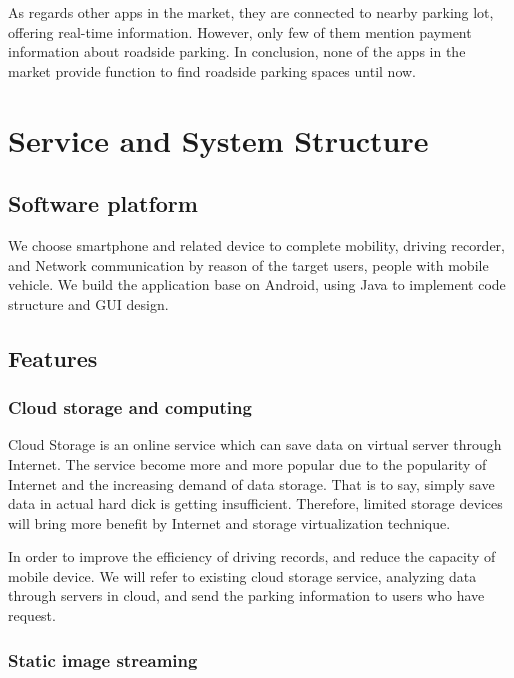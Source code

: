 \documentclass[runningheads,a4paper]{llncs}
\begin{document}
As regards other apps in the market, they are connected to nearby
parking lot, offering real-time information. However, only few of
them mention payment information about roadside parking. In conclusion,
none of the apps in the market provide function to find roadside parking
spaces until now.

\section{Service and System Structure}\label{sec:service}

%
\subsection{Software platform}
%

We choose smartphone and related device to complete mobility, driving
recorder, and Network communication by reason of the target users,
people with mobile vehicle. We build the application base on Android,
using Java to implement code structure and GUI design.

%
\subsection{Features}
%

%
\subsubsection{Cloud storage and computing}
%

Cloud Storage is an online service which can save data on virtual server
through Internet. The service become more and more popular due to the
popularity of Internet and the increasing demand of data storage. That
is to say, simply save data in actual hard dick is getting insufficient.
Therefore, limited storage devices will bring more benefit by Internet
and storage virtualization technique.

In order to improve the efficiency of driving records, and reduce the
capacity of mobile device. We will refer to existing cloud storage
service, analyzing data through servers in cloud, and send the parking
information to users who have request.

%
\subsubsection{Static image streaming}
%
\end{document}
